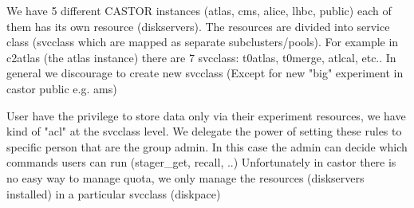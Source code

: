 We have 5 different CASTOR instances (atlas, cms, alice, lhbc, public)
each of them has its own resource (diskservers). The resources are divided into service class (svcclass which are mapped as separate subclusters/pools).
For example in c2atlas (the atlas instance) there are 7 svcclass:
t0atlas, t0merge, atlcal, etc..
In general we discourage to create new svcclass (Except for new "big" experiment in castor public e.g. ams)

User have the privilege to store data only via their experiment resources, we have kind of "acl" at the svcclass level.
We delegate the power of setting these rules to specific person that are the group admin. In this case the admin can decide which commands users can run (stager\_get, recall, ..) 
Unfortunately in castor there is no easy way to manage quota, we only manage the resources (diskservers installed) in a particular svcclass (diskpace)
